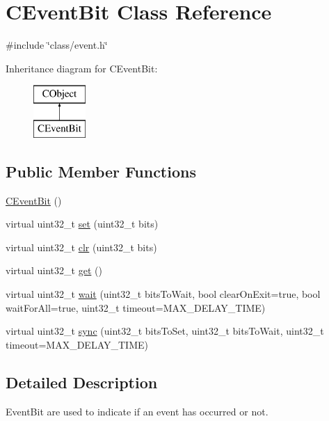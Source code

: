 \hypertarget{class_c_event_bit}{\section{C\-Event\-Bit Class Reference}
\label{class_c_event_bit}
}


{\ttfamily \#include \char`\"{}class/event.\-h\char`\"{}}

Inheritance diagram for C\-Event\-Bit\-:\begin{figure}[H]
\begin{center}
\leavevmode
\includegraphics[height=2.000000cm]{dd/d60/class_c_event_bit}
\end{center}
\end{figure}
\subsection*{Public Member Functions}
\begin{DoxyCompactItemize}
\item 
\hyperlink{class_c_event_bit_afaccf4ea2315ce05229a3a0ae37ba6af}{C\-Event\-Bit} ()
\item 
virtual uint32\-\_\-t \hyperlink{class_c_event_bit_a0b05da65aa8bb0b77dd75f0a84b8fbb0}{set} (uint32\-\_\-t bits)
\item 
virtual uint32\-\_\-t \hyperlink{class_c_event_bit_ade8e4420bd49ab351417ca955bb293e3}{clr} (uint32\-\_\-t bits)
\item 
virtual uint32\-\_\-t \hyperlink{class_c_event_bit_a52b137d375dbb670b2473222c8914081}{get} ()
\item 
virtual uint32\-\_\-t \hyperlink{class_c_event_bit_a4183fe9b9d9cc00cd0ae806c9aaba461}{wait} (uint32\-\_\-t bits\-To\-Wait, bool clear\-On\-Exit=true, bool wait\-For\-All=true, uint32\-\_\-t timeout=M\-A\-X\-\_\-\-D\-E\-L\-A\-Y\-\_\-\-T\-I\-M\-E)
\item 
virtual uint32\-\_\-t \hyperlink{class_c_event_bit_a4a50fd1376946d508762fa00d01034ce}{sync} (uint32\-\_\-t bits\-To\-Set, uint32\-\_\-t bits\-To\-Wait, uint32\-\_\-t timeout=M\-A\-X\-\_\-\-D\-E\-L\-A\-Y\-\_\-\-T\-I\-M\-E)
\end{DoxyCompactItemize}


\subsection{Detailed Description}
Event\-Bit are used to indicate if an event has occurred or not. 

